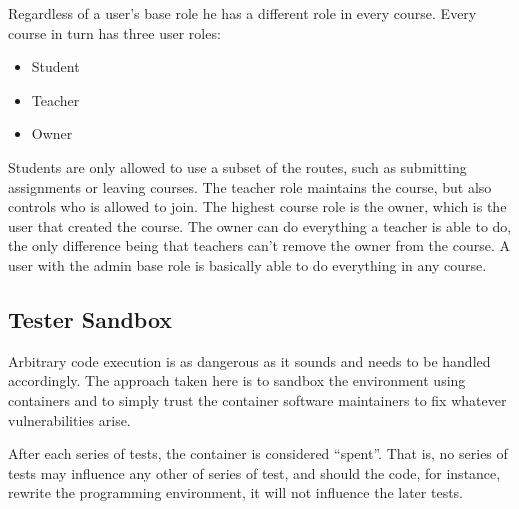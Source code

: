 Regardless of a user's base role he has a different role in every course. Every course in turn has three user roles:
\begin{itemize}
\item Student
\item Teacher
\item Owner
\end{itemize}
Students are only allowed to use a subset of the routes, such as submitting assignments or leaving courses. The teacher role maintains the course, but also controls who is allowed to join. The highest course role is the owner, which is the user that created the course. The owner can do everything a teacher is able to do, the only difference being that teachers can't remove the owner from the course. A user with the admin base role is basically able to do everything in any course.

\subsection{Tester Sandbox}
Arbitrary code execution is as dangerous as it sounds and needs to be handled accordingly. The approach taken here is to sandbox the environment using containers and to simply trust the container software maintainers to fix whatever vulnerabilities arise.

After each series of tests, the container is considered ``spent''. That is, no series of tests may influence any other of series of test, and should the code, for instance, rewrite the programming environment, it will not influence the later tests.

